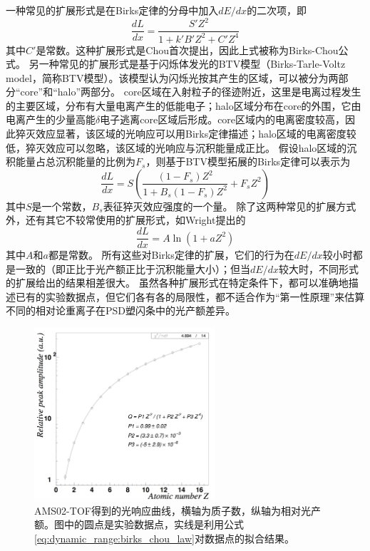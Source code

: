 一种常见的扩展形式是在Birks定律的分母中加入$dE/dx$的二次项，即
\begin{equation}
	\frac{dL}{dx} = \frac{S' Z^2}{1+k'B'Z^2+C'Z^4}
	\label{eq:dynamic_range:birks_chou_law}
\end{equation}
其中$C'$是常数。这种扩展形式是Chou首次提出\parencite{chou_nature_1952}，因此上式被称为Birks-Chou公式。
另一种常见的扩展形式是基于闪烁体发光的BTV模型\parencite{voltz_influence_1966,tarle_cosmic_1979}（Birks-Tarle-Voltz model，简称BTV模型）。该模型认为闪烁光按其产生的区域，可以被分为两部分“core”和“halo”两部分。
core区域在入射粒子的径迹附近，这里是电离过程发生的主要区域，分布有大量电离产生的低能电子；halo区域分布在core的外围，它由电离产生的少量高能$\delta$电子逃离core区域后形成。core区域内的电离密度较高，因此猝灭效应显著，该区域的光响应可以用Birks定律描述；halo区域的电离密度较低，猝灭效应可以忽略，该区域的光响应与沉积能量成正比。
假设halo区域的沉积能量占总沉积能量的比例为$F_s$，则基于BTV模型拓展的Birks定律可以表示为
\begin{equation}
	\frac{dL}{dx} = S(\frac{(1-F_s)Z^2}{1+B_s(1-F_s)Z^2}+F_sZ^2)
	\label{eq:dynamic_range:btv_law}
\end{equation}
其中$S$是一个常数，$B_s$表征猝灭效应强度的一个量。
除了这两种常见的扩展方式外，还有其它不较常使用的扩展形式，如Wright提出的\parencite{wright_scintillation_1953}
\begin{equation}
	\frac{dL}{dx} = A \ln(1+aZ^2)
	\label{eq:dynamic_range:wright_law}
\end{equation}
其中$A$和$a$都是常数。
所有这些对Birks定律的扩展，它们的行为在$dE/dx$较小时都是一致的（即正比于光产额正比于沉积能量大小）；但当$dE/dx$较大时，不同形式的扩展给出的结果相差很大。
虽然各种扩展形式在特定条件下，都可以准确地描述已有的实验数据点，但它们各有各的局限性，都不适合作为“第一性原理”来估算不同的相对论重离子在PSD塑闪条中的光产额差异。

\begin{figure}[htbp]
	\centering
	\includegraphics[width=0.6\textwidth]{chap/dynamic_range/fig/ams02_tof.png}
	\caption{AMS02-TOF得到的光响应曲线，横轴为质子数，纵轴为相对光产额。图中的圆点是实验数据点，实线是利用公式\ref{eq:dynamic_range:birks_chou_law}对数据点的拟合结果。}
	\label{fig:dynamic_range:AMS02}
\end{figure}

